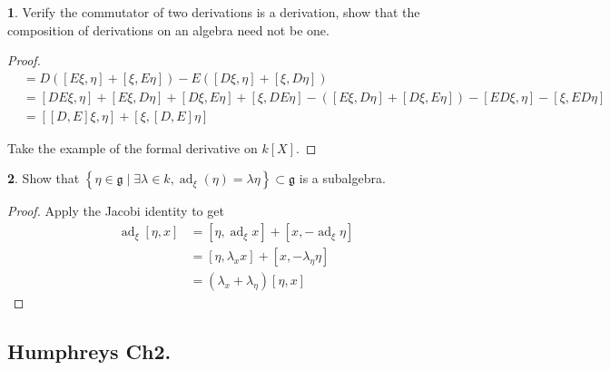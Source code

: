 \documentclass[10.5pt]{article}
\theoremstyle{definition}
\newtheorem{pb}{}
\numberwithin{example}{subsection}
\numberwithin{proposition}{subsection}
\numberwithin{pb}{subsection}
\newcommand{\set}[1]{\left\{#1\right\}}
\begin{document}
        \begin{pb}
            Verify the commutator of two derivations is a derivation, show that the composition of derivations on an algebra need not be one.
            
            \begin{proof}
                \begin{align}
                    [D,E][\xi,\eta] &= D([E\xi,\eta] + [\xi,E\eta]) - E([D\xi,\eta] + [\xi,D\eta]) \\
                    &= [DE\xi,\eta] + [E\xi,D\eta] + [D\xi,E\eta] + [\xi,DE\eta] - ([E\xi,D\eta] + [D\xi,E\eta]) - [ED\xi,\eta] - [\xi,ED\eta] \\
                    &= [[D,E]\xi,\eta] + [\xi,[D,E]\eta]
                \end{align}

                Take the example of the formal derivative on \(k[X]\).
            \end{proof}
        \end{pb}
        \begin{pb}
            Show that \(\set{\eta \in \mathfrak{g} \mid \exists \lambda \in k, \operatorname{ad}_\xi(\eta) = \lambda \eta} \subset \mathfrak{g}\) is a subalgebra.

            \begin{proof}
                Apply the Jacobi identity to get
                \begin{align}
                    \operatorname{ad}_\xi[\eta,x] &= [\eta,\operatorname{ad}_\xi x] + [x, -\operatorname{ad}_\xi \eta] \\
                    &=[\eta, \lambda_x x] + [x,-\lambda_\eta \eta] \\
                    &= (\lambda_x + \lambda_\eta)[\eta,x]
                \end{align}
            \end{proof}
        \end{pb}

        \subsection{Humphreys Ch2.}
\end{document}

